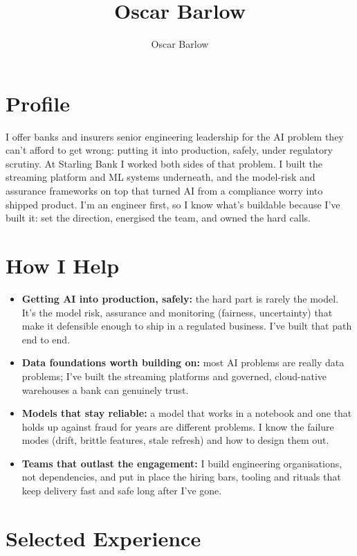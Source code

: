 \documentclass[a4paper]{scrartcl}
\author{Oscar Barlow}
\title{Oscar Barlow}
\date{}
\begin{document}
\maketitle

\section*{Profile}
{ %
  \setlength{\parskip}{6pt plus 2pt minus 1pt}
  I offer banks and insurers senior engineering leadership for the AI problem they can't afford to get
  wrong: putting it into production, safely, under regulatory scrutiny. At Starling Bank I worked both sides of that
  problem. I built the streaming platform and ML systems underneath, and the model-risk and assurance
  frameworks on top that turned AI from a compliance worry into shipped product. I'm an engineer first, so I know
  what's buildable because I've built it: set the direction, energised the team, and owned the hard calls.
} %

\section*{How I Help}
\begin{itemize}
  \item \textbf{Getting AI into production, safely:} the hard part is rarely the model. It's the
    model risk, assurance and monitoring (fairness, uncertainty) that make it defensible enough to
    ship in a regulated business. I've built that path end to end.
  \item \textbf{Data foundations worth building on:} most AI problems are really data problems; I've built
    the streaming platforms and governed, cloud-native warehouses a bank can genuinely trust.
  \item \textbf{Models that stay reliable:} a model that works in a notebook and one that holds up against
    fraud for years are different problems. I know the failure modes (drift, brittle features, stale
    refresh) and how to design them out.
  \item \textbf{Teams that outlast the engagement:} I build engineering organisations, not dependencies,
    and put in place the hiring bars, tooling and rituals that keep delivery fast and safe long after I've gone.
\end{itemize}

\section*{Selected Experience}
\end{document}
